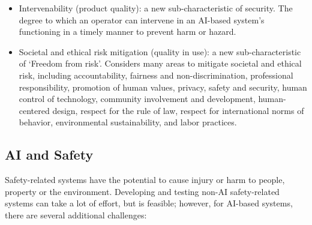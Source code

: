 \documentclass[
  letterpaper,
  DIV=11,
  numbers=noendperiod,
  oneside]{scrreprt}
\begin{document}
\begin{tcolorbox}
\begin{itemize}
  maintain its level of AI functional correctness regardless of
  circumstances, such as the presence of biased, adversarial, or invalid
  data inputs, external interference, adverse environmental conditions,
  and operator misuse.
\item
  Intervenability{} (product quality): a new sub-characteristic of
  security. The degree to which an operator can intervene in an AI-based
  system's functioning in a timely manner to prevent harm or hazard.
\item
  Societal and ethical risk mitigation{} (quality in use): a new
  sub-characteristic of `Freedom from risk'. Considers many areas to
  mitigate societal and ethical risk, including accountability, fairness
  and non-discrimination, professional responsibility, promotion of
  human values, privacy, safety and security, human control of
  technology, community involvement and development, human-centered
  design, respect for the rule of law, respect for international norms
  of behavior, environmental sustainability, and labor practices.
\end{itemize}

\subsection{\texorpdfstring{AI and
Safety{}}{AI and Safety}}\label{ai-and-safety}

Safety-related systems have the potential to cause injury or harm to
people, property or the environment. Developing and testing non-AI
safety-related systems can take a lot of effort, but is feasible;
however, for AI-based systems, there are several additional challenges:


\end{tcolorbox}
\end{document}
